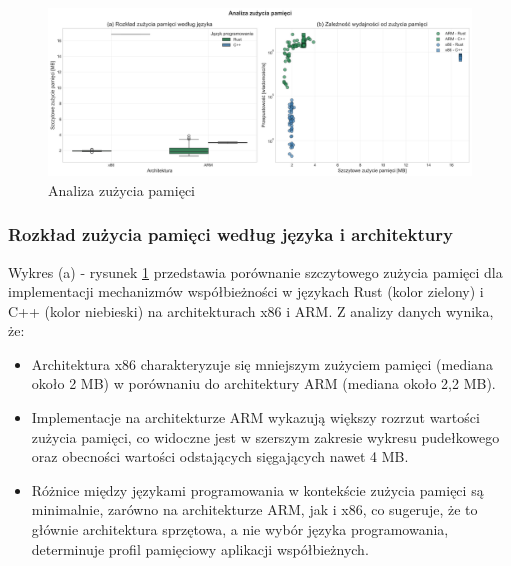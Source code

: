 \begin{figure}[H]
    \centering
    \includegraphics[width=\textwidth]{analiza/images/conc/pc/compare/rysunek_3_zuzycie_pamieci.png}
    \caption{Analiza zużycia pamięci}
    \label{rysunek_3_zuzycie_pamieci}
\end{figure}

\subsubsection{Rozkład zużycia pamięci według języka i architektury}
Wykres (a) - rysunek \ref{rysunek_3_zuzycie_pamieci} przedstawia porównanie szczytowego zużycia pamięci dla implementacji mechanizmów współbieżności w językach Rust (kolor zielony) i C++ (kolor niebieski) na architekturach x86 i ARM. Z analizy danych wynika, że:
\begin{itemize}
    \item Architektura x86 charakteryzuje się mniejszym zużyciem pamięci (mediana około 2 MB) w porównaniu do architektury ARM (mediana około 2,2 MB).
    \item Implementacje na architekturze ARM wykazują większy rozrzut wartości zużycia pamięci, co widoczne jest w szerszym zakresie wykresu pudełkowego oraz obecności wartości odstających sięgających nawet 4 MB.
    \item Różnice między językami programowania w kontekście zużycia pamięci są minimalnie, zarówno na architekturze ARM, jak i x86, co sugeruje, że to głównie architektura sprzętowa, a nie wybór języka programowania, determinuje profil pamięciowy aplikacji współbieżnych.
\end{itemize}

